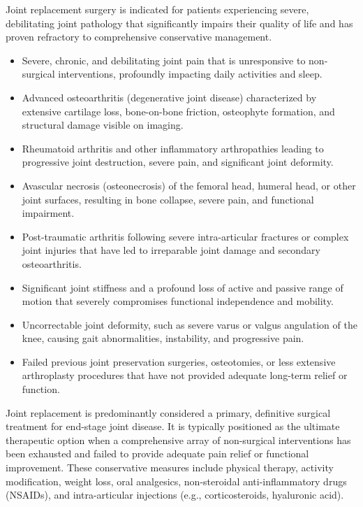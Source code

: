Joint replacement surgery is indicated for patients experiencing severe, debilitating joint pathology that significantly impairs their quality of life and has proven refractory to comprehensive conservative management.

\begin{itemize}
  \item Severe, chronic, and debilitating joint pain that is unresponsive to non-surgical interventions, profoundly impacting daily activities and sleep.
  \item Advanced osteoarthritis (degenerative joint disease) characterized by extensive cartilage loss, bone-on-bone friction, osteophyte formation, and structural damage visible on imaging.
  \item Rheumatoid arthritis and other inflammatory arthropathies leading to progressive joint destruction, severe pain, and significant joint deformity.
  \item Avascular necrosis (osteonecrosis) of the femoral head, humeral head, or other joint surfaces, resulting in bone collapse, severe pain, and functional impairment.
  \item Post-traumatic arthritis following severe intra-articular fractures or complex joint injuries that have led to irreparable joint damage and secondary osteoarthritis.
  \item Significant joint stiffness and a profound loss of active and passive range of motion that severely compromises functional independence and mobility.
  \item Uncorrectable joint deformity, such as severe varus or valgus angulation of the knee, causing gait abnormalities, instability, and progressive pain.
  \item Failed previous joint preservation surgeries, osteotomies, or less extensive arthroplasty procedures that have not provided adequate long-term relief or function.
\end{itemize}

Joint replacement is predominantly considered a primary, definitive surgical treatment for end-stage joint disease. It is typically positioned as the ultimate therapeutic option when a comprehensive array of non-surgical interventions has been exhausted and failed to provide adequate pain relief or functional improvement. These conservative measures include physical therapy, activity modification, weight loss, oral analgesics, non-steroidal anti-inflammatory drugs (NSAIDs), and intra-articular injections (e.g., corticosteroids, hyaluronic acid).

